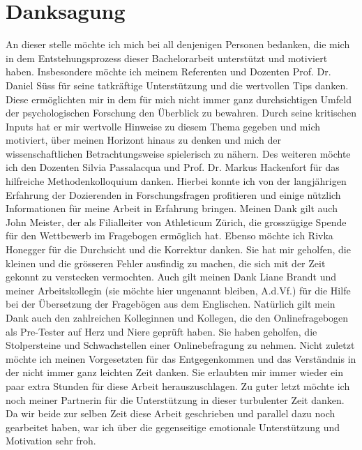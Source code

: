 %
%
\thispagestyle{empty} 
\let\raggedsection\centering
\chapter*{Danksagung}\label{label.danksagung}
\let\raggedsection\raggedright 
An dieser stelle möchte ich mich bei all denjenigen Personen bedanken, die mich in dem Entstehungsprozess dieser Bachelorarbeit unterstützt und motiviert haben. Insbesondere möchte ich meinem Referenten und Dozenten Prof. Dr. Daniel Süss für seine tatkräftige Unterstützung und die wertvollen Tips danken. Diese ermöglichten mir in dem für mich nicht immer ganz durchsichtigen Umfeld der psychologischen Forschung den Überblick zu bewahren. Durch seine kritischen Inputs hat er mir wertvolle Hinweise zu diesem Thema gegeben und mich motiviert, über meinen Horizont hinaus zu denken und mich der wissenschaftlichen Betrachtungsweise spielerisch zu nähern. Des weiteren möchte ich den Dozenten Silvia Passalacqua und Prof. Dr. Markus Hackenfort für das hilfreiche Methodenkolloquium danken. Hierbei konnte ich von der langjährigen Erfahrung der Dozierenden in Forschungsfragen profitieren und einige nützlich Informationen für meine Arbeit in Erfahrung bringen. Meinen Dank gilt auch John Meister, der als Filialleiter von Athleticum Zürich, die grosszügige Spende für den Wettbewerb im Fragebogen ermöglich hat. Ebenso möchte ich Rivka Honegger für die Durchsicht und die Korrektur danken. Sie hat mir geholfen, die kleinen und die grösseren Fehler ausfindig zu machen, die sich mit der Zeit gekonnt zu verstecken vermochten. Auch gilt meinen Dank Liane Brandt und meiner Arbeitskollegin (sie möchte hier ungenannt bleiben, A.d.Vf.) für die Hilfe bei der Übersetzung der Fragebögen aus dem Englischen. Natürlich gilt mein Dank auch den zahlreichen Kolleginnen und Kollegen, die den Onlinefragebogen als Pre-Tester auf Herz und Niere geprüft haben. Sie haben geholfen, die Stolpersteine und Schwachstellen einer Onlinebefragung zu nehmen. Nicht zuletzt möchte ich meinen Vorgesetzten für das Entgegenkommen und das Verständnis in der nicht immer ganz leichten Zeit danken. Sie erlaubten mir immer wieder ein paar extra Stunden für diese Arbeit herauszuschlagen. Zu guter letzt möchte ich noch meiner Partnerin für die Unterstützung in dieser turbulenter Zeit danken. Da wir beide zur selben Zeit diese Arbeit geschrieben und parallel dazu noch gearbeitet haben, war ich über die gegenseitige emotionale Unterstützung und Motivation sehr froh. 